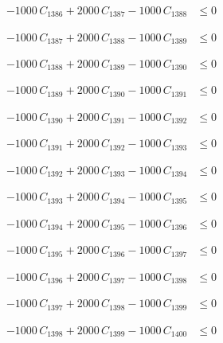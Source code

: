 \documentclass[a4paper,11pt]{article}
\begin{document}
\begin{align}
-1000\,C_{1386} + 2000\,C_{1387} - 1000\,C_{1388} &\leq 0 \nonumber
\end{align}

\begin{align}
-1000\,C_{1387} + 2000\,C_{1388} - 1000\,C_{1389} &\leq 0 \nonumber
\end{align}

\begin{align}
-1000\,C_{1388} + 2000\,C_{1389} - 1000\,C_{1390} &\leq 0 \nonumber
\end{align}

\begin{align}
-1000\,C_{1389} + 2000\,C_{1390} - 1000\,C_{1391} &\leq 0 \nonumber
\end{align}

\begin{align}
-1000\,C_{1390} + 2000\,C_{1391} - 1000\,C_{1392} &\leq 0 \nonumber
\end{align}

\begin{align}
-1000\,C_{1391} + 2000\,C_{1392} - 1000\,C_{1393} &\leq 0 \nonumber
\end{align}

\begin{align}
-1000\,C_{1392} + 2000\,C_{1393} - 1000\,C_{1394} &\leq 0 \nonumber
\end{align}

\begin{align}
-1000\,C_{1393} + 2000\,C_{1394} - 1000\,C_{1395} &\leq 0 \nonumber
\end{align}

\begin{align}
-1000\,C_{1394} + 2000\,C_{1395} - 1000\,C_{1396} &\leq 0 \nonumber
\end{align}

\begin{align}
-1000\,C_{1395} + 2000\,C_{1396} - 1000\,C_{1397} &\leq 0 \nonumber
\end{align}

\begin{align}
-1000\,C_{1396} + 2000\,C_{1397} - 1000\,C_{1398} &\leq 0 \nonumber
\end{align}

\begin{align}
-1000\,C_{1397} + 2000\,C_{1398} - 1000\,C_{1399} &\leq 0 \nonumber
\end{align}

\begin{align}
-1000\,C_{1398} + 2000\,C_{1399} - 1000\,C_{1400} &\leq 0 \nonumber
\end{align}
\end{document}
